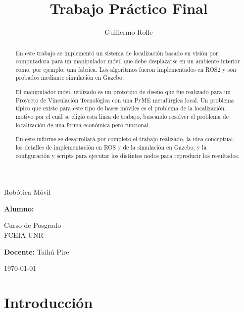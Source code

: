 \documentclass[12pt, a4paper]{report}
\title{Trabajo Práctico Final}
\author{Guillermo Rolle}
\begin{document}
	\begin{titlepage}
		\makeatletter
		\begin{center}
			\vspace{1cm}
			\Huge
			\textbf{\@title}

			\vspace{0.5cm}
			\LARGE
			Robótica Móvil

			\vspace{1.5cm}

			\textbf{Alumno: }\@author\\


			\vfill

			\Large
			Curso de Posgrado\\FCEIA-UNR

			\vspace{1.5cm}
			\textbf{Docente: }Taihú Pire

			\vspace{0.8cm}
			\Large
			\today
		\end{center}
		\makeatother
	\end{titlepage}

	\begin{abstract}

		En este trabajo se implementó un sistema de localización basado en visión por computadora para un manipulador móvil que debe desplazarse en un ambiente interior como, por ejemplo, una fábrica. Los algoritmos fueron implementados en ROS2 y son probados mediante simulación en Gazebo.

		El manipulador móvil utilizado es un prototipo de diseño que fue realizado para un Proyecto de Vinculación Tecnológica con una PyME metalúrgica local. Un problema típico que existe para este tipo de bases móviles es el problema de la localización, motivo por el cuál se eligió esta línea de trabajo, buscando resolver el problema de localización de una forma económica pero funcional.

		En este informe se desarrollará por completo el trabajo realizado, la idea conceptual, los detalles de implementación en ROS y de la simulación en Gazebo; y la configuración y scripts para ejecutar los distintos nodos para reproducir los resultados.
	\end{abstract}

	\newpage
	\tableofcontents
	\newpage

	\newpage

    \chapter{Introducción}\label{ch:intro}
\end{document}
